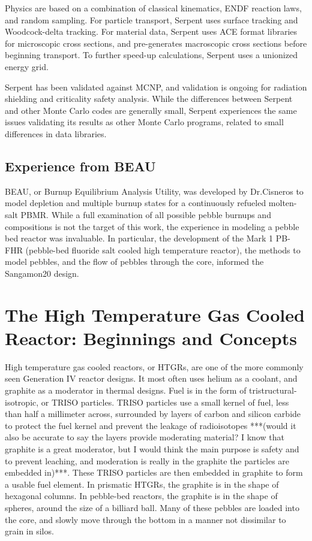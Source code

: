 Physics are based on a combination of classical kinematics, ENDF reaction laws, and random sampling.  For particle transport, Serpent uses surface tracking and Woodcock-delta tracking.  For material data, Serpent uses ACE format libraries for microscopic cross sections, and pre-generates macroscopic cross sections before beginning transport.  To further speed-up calculations, Serpent uses a unionized energy grid.

Serpent has been validated against MCNP, and validation is ongoing for radiation shielding and criticality safety analysis.  While the differences between Serpent and other Monte Carlo codes are generally small, Serpent experiences the same issues validating its results as other Monte Carlo programs, related to small differences in data libraries.

\subsection{Experience from BEAU}

BEAU, or Burnup Equilibrium Analysis Utility, was developed by Dr.Cisneros to model depletion and multiple burnup states for a continuously refueled molten-salt PBMR.  While a full examination of all possible pebble burnups and compositions is not the target of this work, the experience in modeling a pebble bed reactor was invaluable.  In particular, the development of the Mark 1 PB-FHR (pebble-bed fluoride salt cooled high temperature reactor), the methods to model pebbles, and the flow of pebbles through the core, informed the Sangamon20 design.


\section{The High Temperature Gas Cooled Reactor: Beginnings and Concepts}

High temperature gas cooled reactors, or HTGRs, are one of the more commonly seen Generation IV reactor designs.  It most often uses helium as a coolant, and graphite as a moderator in thermal designs.  Fuel is in the form of tristructural-isotropic, or TRISO particles.  TRISO particles use a small kernel of fuel, less than half a millimeter across, surrounded by layers of carbon and silicon carbide to protect the fuel kernel and prevent the leakage of radioisotopes ***(would it also be accurate to say the layers provide moderating material?  I know that graphite is a great moderator, but I would think the main purpose is safety and to prevent leaching, and moderation is really in the graphite the particles are embedded in)***.  These TRISO particles are then embedded in graphite to form a usable fuel element.  In prismatic HTGRs, the graphite is in the shape of hexagonal columns.  In pebble-bed reactors, the graphite is in the shape of spheres, around the size of a billiard ball.  Many of these pebbles are loaded into the core, and slowly move through the bottom in a manner not dissimilar to grain in silos.

